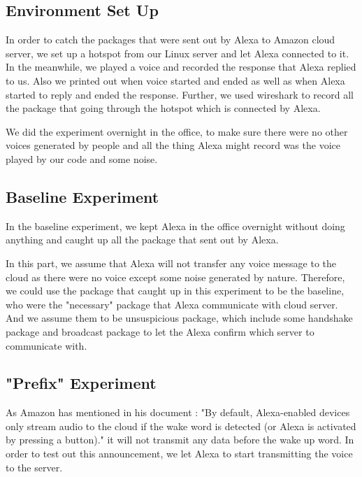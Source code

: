 \subsection{Environment Set Up}

In order to catch the packages that were sent out by Alexa to Amazon cloud server, we  set up a hotspot from our Linux server and let Alexa connected to it. In the meanwhile, we played a voice and recorded the response that Alexa replied to us. Also we printed out when voice started and ended as well as when Alexa started to reply and ended the response. Further, we used wireshark to record all the package that going through the hotspot which is connected by Alexa. 

We did the experiment overnight in the office, to make sure there were no other voices generated by people and all the thing Alexa might record was the voice played by our code and some noise.

\subsection{Baseline Experiment}

In the baseline experiment, we kept Alexa in the office overnight without doing anything and caught up all the package that sent out by Alexa.

In this part, we assume that Alexa will not transfer any voice message to the cloud as there were no voice except some noise generated by nature. Therefore, we could use the package that caught up in this experiment to be the baseline, who were the "necessary" package that Alexa communicate with cloud server. And we assume them to be unsuspicious package, which include some handshake package and broadcast package to let the Alexa confirm which server to communicate with.

\subsection{"Prefix" Experiment}

As Amazon has mentioned in his document \todo{[1]}: "By default, Alexa-enabled devices only stream audio to the cloud if the wake word is detected (or Alexa is activated by pressing a button)." it will not transmit any data before the wake up word. In order to test out this announcement, we let Alexa to start transmitting the voice to the server. 

